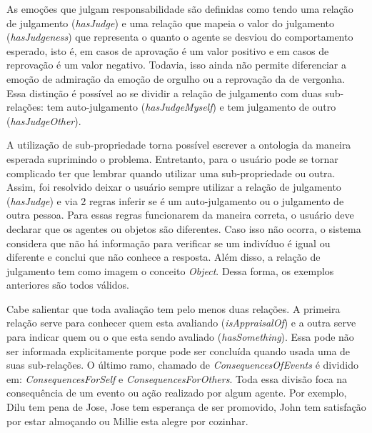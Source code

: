 As emoções que julgam responsabilidade são definidas como tendo uma relação de
julgamento (\emph{hasJudge}) e uma relação que mapeia o valor do julgamento
(\emph{hasJudgeness}) que representa o quanto o agente se desviou do
comportamento esperado, isto é, em casos de aprovação é um valor positivo e em
casos de reprovação é um valor negativo. Todavia, isso ainda não permite
diferenciar a emoção de admiração da emoção de orgulho ou a reprovação da de
vergonha. Essa distinção é possível ao se dividir a relação de julgamento com
duas sub-relações: tem auto-julgamento (\emph{hasJudgeMyself}) e tem
julgamento de outro (\emph{hasJudgeOther}).

A utilização de sub-propriedade torna possível escrever a ontologia da maneira
esperada suprimindo o problema. Entretanto, para o usuário pode se tornar
complicado ter que lembrar quando utilizar uma sub-propriedade ou outra.
Assim, foi resolvido deixar o usuário sempre utilizar a relação de julgamento
(\emph{hasJudge}) e via 2 regras inferir se é um auto-julgamento ou o
julgamento de outra pessoa. Para essas regras funcionarem da maneira correta,
o usuário deve declarar que os agentes ou objetos são diferentes. Caso isso
não ocorra, o sistema considera que não há informação para verificar se um
indivíduo é igual ou diferente e conclui que não conhece a resposta. Além
disso, a relação de julgamento tem como imagem o conceito \emph{Object}. Dessa
forma, os exemplos anteriores são todos válidos.

Cabe salientar que toda avaliação tem pelo menos duas relações. A primeira
relação serve para conhecer quem esta avaliando (\emph{isAppraisalOf}) e a
outra serve para indicar quem ou o que esta sendo avaliado
(\emph{hasSomething}). Essa pode não ser informada explicitamente porque pode
ser concluída quando usada uma de suas sub-relações. O último ramo, chamado de
\emph{ConsequencesOfEvents} é dividido em: \emph{ConsequencesForSelf} e
\emph{ConsequencesForOthers}. Toda essa divisão foca na consequência de um
evento ou ação realizado por algum agente. Por exemplo, Dilu tem pena
de Jose, Jose tem esperança de ser promovido, John tem satisfação por
estar almoçando ou Millie esta alegre por cozinhar.

